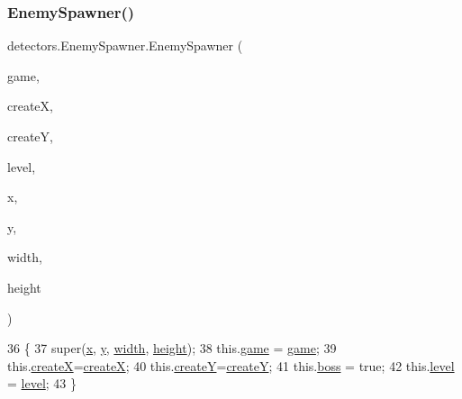 \subsubsection{\texorpdfstring{Enemy\+Spawner()}{EnemySpawner()}\hspace{0.1cm}{\footnotesize\ttfamily [2/2]}}
{\footnotesize\ttfamily detectors.\+Enemy\+Spawner.\+Enemy\+Spawner (\begin{DoxyParamCaption}\item[{\mbox{\hyperlink{classstates_1_1_game_state}{Game\+State}}}]{game,  }\item[{int}]{createX,  }\item[{int}]{createY,  }\item[{int}]{level,  }\item[{float}]{x,  }\item[{float}]{y,  }\item[{float}]{width,  }\item[{float}]{height }\end{DoxyParamCaption})\hspace{0.3cm}{\ttfamily [inline]}}


\begin{DoxyCode}
36                                                                                                            
                    \{
37         super(\mbox{\hyperlink{classorg_1_1newdawn_1_1slick_1_1geom_1_1_shape_a3e985bfff386c15a4efaad03d8ad60d3}{x}}, \mbox{\hyperlink{classorg_1_1newdawn_1_1slick_1_1geom_1_1_shape_a9f934baded6a1b65ebb69e7e5f80ea00}{y}}, \mbox{\hyperlink{classorg_1_1newdawn_1_1slick_1_1geom_1_1_rectangle_a967e1823f62daf45abb142779d1be62d}{width}}, \mbox{\hyperlink{classorg_1_1newdawn_1_1slick_1_1geom_1_1_rectangle_a3bd010fdce636fc11ed0e0ad4d4b4a0a}{height}});
38         this.\mbox{\hyperlink{classdetectors_1_1_enemy_spawner_af4c20a8a788ed80f1379da33fa15d4a2}{game}} = \mbox{\hyperlink{classdetectors_1_1_enemy_spawner_af4c20a8a788ed80f1379da33fa15d4a2}{game}};
39         this.\mbox{\hyperlink{classdetectors_1_1_enemy_spawner_ab14511f92f58a32c0b062c97add58a51}{createX}}=\mbox{\hyperlink{classdetectors_1_1_enemy_spawner_ab14511f92f58a32c0b062c97add58a51}{createX}};
40         this.\mbox{\hyperlink{classdetectors_1_1_enemy_spawner_ac460462da79f38d12eb840cc4d844759}{createY}}=\mbox{\hyperlink{classdetectors_1_1_enemy_spawner_ac460462da79f38d12eb840cc4d844759}{createY}};
41         this.\mbox{\hyperlink{classdetectors_1_1_enemy_spawner_a1d4038a75d86f476b072ebb3d4a0a345}{boss}} = \textcolor{keyword}{true};
42         this.\mbox{\hyperlink{classdetectors_1_1_enemy_spawner_a7a6789978d67aac73834d97f875ad213}{level}} = \mbox{\hyperlink{classdetectors_1_1_enemy_spawner_a7a6789978d67aac73834d97f875ad213}{level}};
43     \}
\end{DoxyCode}


